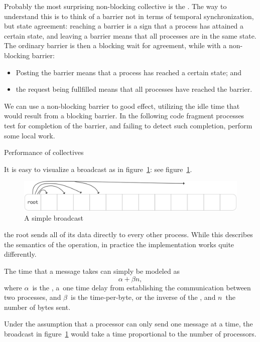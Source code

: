 Probably the most surprising non-blocking collective is the
. The way to understand this is to think of
a barrier not in terms of temporal synchronization, but state
agreement: reaching a barrier is a sign that a process has attained a
certain state, and leaving a barrier means that all processes are in
the same state. The ordinary barrier is then a blocking wait for
agreement, while with a non-blocking barrier:
\begin{itemize}
\item Posting the barrier means that a process has reached a certain
  state; and
\item the request being fullfilled means that all processes have
  reached the barrier.
\end{itemize}


We can use a non-blocking barrier to good effect, utilizing the idle
time that would result from a blocking barrier. In the following code
fragment processes test for completion of the barrier, and failing to
detect such completion, perform some local work.


 {Performance of collectives}

It is easy to visualize a broadcast as in figure~\ref{fig:bcast-simple}:
see figure~\ref{fig:bcast-simple}.
\begin{figure}[ht]
  \includegraphics[scale=.08]{graphics/bcast-simple}
  \caption{A simple broadcast}
  \label{fig:bcast-simple}
\end{figure}
the root sends all of its data directly to every other process.
While this describes the semantics of the operation, in practice
the implementation works quite differently.

The time that a message takes can simply be modeled as
\[ \alpha +\beta n, \]
where $\alpha$~is the , a~one time
delay from establishing the communication between two processes,
and $\beta$~is the time-per-byte, or the inverse of the ,
and $n$~the number of bytes sent.

Under the assumption that
a processor can only send one message at a time,
the broadcast in
figure~\ref{fig:bcast-simple} would take a time proportional to the
number of processors.

